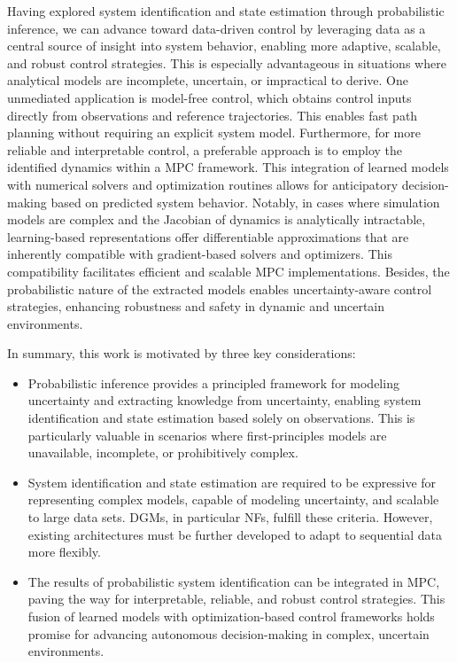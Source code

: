 Having explored system identification and state estimation through probabilistic inference, we can advance toward data-driven control by leveraging data as a central source of insight into system behavior, enabling more adaptive, scalable, and robust control strategies. This is especially advantageous in situations where analytical models are incomplete, uncertain, or impractical to derive. One unmediated application is model-free control, which obtains control inputs directly from observations and reference trajectories. This enables fast path planning without requiring an explicit system model. Furthermore, for more reliable and interpretable control, a preferable approach is to employ the identified dynamics within a \acf{MPC} framework. This integration of learned models with numerical solvers and optimization routines allows for anticipatory decision-making based on predicted system behavior. Notably, in cases where simulation models are complex and the Jacobian of dynamics is analytically intractable, learning-based representations offer differentiable approximations that are inherently compatible with gradient-based solvers and optimizers. This compatibility facilitates efficient and scalable MPC implementations. Besides, the probabilistic nature of the extracted models enables uncertainty-aware control strategies, enhancing robustness and safety in dynamic and uncertain environments.

In summary, this work is motivated by three key considerations:
\begin{itemize}
    \item Probabilistic inference provides a principled framework for modeling uncertainty and extracting knowledge from uncertainty, enabling system identification and state estimation based solely on observations. This is particularly valuable in scenarios where first-principles models are unavailable, incomplete, or prohibitively complex.
    \item System identification and state estimation are required to be expressive for representing complex models, capable of modeling uncertainty, and scalable to large data sets. \acfp{DGM}, in particular \acfp{NF}, fulfill these criteria. However, existing architectures must be further developed to adapt to sequential data more flexibly.
    \item The results of probabilistic system identification can be integrated in \acf{MPC}, paving the way for interpretable, reliable, and robust control strategies. This fusion of learned models with optimization-based control frameworks holds promise for advancing autonomous decision-making in complex, uncertain environments.
\end{itemize}